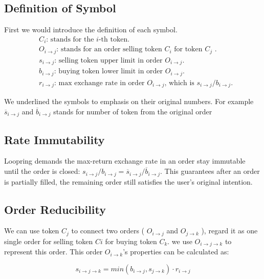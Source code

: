 \documentclass[UTF8,nofonts]{article}
\begin{document}
\subsection{Definition of Symbol}

First we would introduce the definition of each symbol.
\[
\begin{split}
&C_{i}\text{: \ }\text{stands for the $i$-th token.}\\
&O_{i\rightarrow j}\text{: \ }\text{stands for an order selling token $C_{i}$ for token $C_{j}$ .}\\
&s_{i\rightarrow j}\text{: \ }\text{selling token upper limit in order $O_{i\rightarrow j}$.}\\
&b_{i\rightarrow j}\text{: \ }\text{buying token lower limit in order $O_{i\rightarrow j}$.}\\
&r_{i\rightarrow j}\text{: \ }\text{max exchange rate in order $O_{i\rightarrow j}$, which is $s_{i\rightarrow j} / b_{i\rightarrow j}$.}
\end{split}
\]


We underlined the symbols to emphasis on their original numbers. For example $\overline{s}_{i\rightarrow j}$ and $\overline{b}_{i\rightarrow j}$ stands for number of token from the original order

\subsection{Rate Immutability\label{sec: consistrate}}

Loopring demands the max-return exchange rate in an order stay immutable until the order is closed: 
$s_{i\rightarrow j} / b_{i\rightarrow j} = \overline{s}_{i\rightarrow j}/ \overline{b}_{i\rightarrow j}$. This guarantees after an order is partially filled, the remaining order still satisfies the user's original intention.

\subsection{Order Reducibility\label{sec: reducibility}}


We can use token $C_j$ to connect two orders ( $O_{i\rightarrow j}$ and $O_{j\rightarrow k}$ ),  regard it as one single order for selling token $Ci$ for buying token $C_k$. we use $O_{i\rightarrow j\rightarrow k}$ to represent this order. This order $O_{i\rightarrow k}$'s properties can be calculated as: 

\begin{equation}
s_{i\rightarrow j\rightarrow k}=min(b_{i\rightarrow j}, s_{j\rightarrow k}) \cdot r_{i\rightarrow j}
\end{equation}
\end{document}
